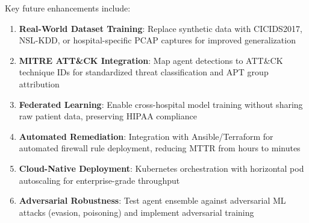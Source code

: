 \documentclass[12pt, a4paper]{report}
\begin{document}
Key future enhancements include:
\begin{enumerate}
    \item \textbf{Real-World Dataset Training}: Replace synthetic data with CICIDS2017, NSL-KDD, or hospital-specific PCAP captures for improved generalization
    \item \textbf{MITRE ATT\&CK Integration}: Map agent detections to ATT\&CK technique IDs for standardized threat classification and APT group attribution
    \item \textbf{Federated Learning}: Enable cross-hospital model training without sharing raw patient data, preserving HIPAA compliance
    \item \textbf{Automated Remediation}: Integration with Ansible/Terraform for automated firewall rule deployment, reducing MTTR from hours to minutes
    \item \textbf{Cloud-Native Deployment}: Kubernetes orchestration with horizontal pod autoscaling for enterprise-grade throughput
    \item \textbf{Adversarial Robustness}: Test agent ensemble against adversarial ML attacks (evasion, poisoning) and implement adversarial training
\end{enumerate}
\end{document}
